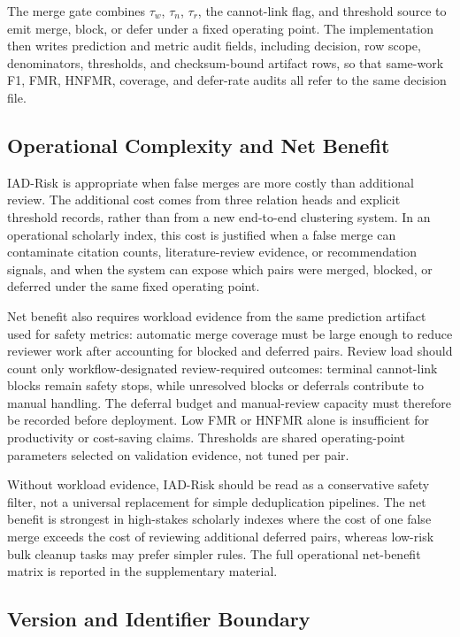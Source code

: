 \documentclass[11pt]{article}
\begin{document}
The merge gate combines $\tau_w$, $\tau_n$, $\tau_r$, the cannot-link flag, and threshold source to emit merge, block, or defer under a fixed operating point. The implementation then writes prediction and metric audit fields, including decision, row scope, denominators, thresholds, and checksum-bound artifact rows, so that same-work F1, FMR, HNFMR, coverage, and defer-rate audits all refer to the same decision file.

\subsection{Operational Complexity and Net Benefit}

IAD-Risk is appropriate when false merges are more costly than additional review. The additional cost comes from three relation heads and explicit threshold records, rather than from a new end-to-end clustering system. In an operational scholarly index, this cost is justified when a false merge can contaminate citation counts, literature-review evidence, or recommendation signals, and when the system can expose which pairs were merged, blocked, or deferred under the same fixed operating point.

Net benefit also requires workload evidence from the same prediction artifact used for safety metrics: automatic merge coverage must be large enough to reduce reviewer work after accounting for blocked and deferred pairs. Review load should count only workflow-designated review-required outcomes: terminal cannot-link blocks remain safety stops, while unresolved blocks or deferrals contribute to manual handling. The deferral budget and manual-review capacity must therefore be recorded before deployment. Low FMR or HNFMR alone is insufficient for productivity or cost-saving claims. Thresholds are shared operating-point parameters selected on validation evidence, not tuned per pair.

Without workload evidence, IAD-Risk should be read as a conservative safety filter, not a universal replacement for simple deduplication pipelines. The net benefit is strongest in high-stakes scholarly indexes where the cost of one false merge exceeds the cost of reviewing additional deferred pairs, whereas low-risk bulk cleanup tasks may prefer simpler rules. The full operational net-benefit matrix is reported in the supplementary material.

\subsection{Version and Identifier Boundary}
\end{document}
